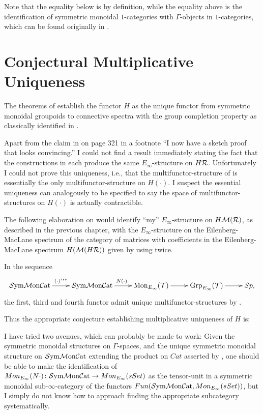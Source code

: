 Note that the equality below is by definition, while the equality above is the
identification of symmetric monoidal $1$-categories with $\Gamma$-objects in $1$-categories,
which can be found originally in \cite{Th1,Th2}.

\section{Conjectural Multiplicative Uniqueness}
The theorems of \cite{GGN} establish the functor $H$ as the unique
functor from symmetric monoidal groupoids to connective spectra with the
group completion property as classically identified in \cite{MT1978}. 

Apart from the claim in \cite{May2009} on page 321 in a footnote ``I now have 
a sketch proof that looks convincing.'' I could not find a result immediately 
stating the fact that the constructions in \cite{EM,May2009,GGN} each produce the 
same $E_\infty$-structure on $H\mathcal{R}$. Unfortunately I could not prove 
this uniqueness, i.e., that the multifunctor-structure 
of \cite{EM} is essentially the only multifunctor-structure on $H(\cdot)$. I suspect
the essential uniqueness can analogously to \cite{BGT,BGT2013,GGN} be specified to
say the space of multifunctor-structures on $H(\cdot)$ is actually contractible.

The following elaboration on \cite[p. 19]{GGN} would identify ``my'' 
$E_\infty$-structure on $H\mathcal{M}(\mathcal{R})$, as described in the previous chapter, 
with the $E_\infty$-structure on the Eilenberg-MacLane spectrum 
of the category of matrices with coefficients in the Eilenberg-MacLane
spectrum $H(\mathcal{M}(H\mathcal{R}))$ given by using \cite{EM} twice.

In the sequence
\[\xymatrix{\SymMonCat \ar[r]^{(\cdot)^{iso}} &\SymMonCat 
\ar[r]^{N(\cdot)} & \mathrm{Mon}_{E_\infty}(\mathcal{T})
\ar[r] & \mathrm{Grp}_{E_\infty}(\mathcal{T}) \ar[r] & Sp,}\]
the first, third and fourth functor admit unique multifunctor-structures by \cite{GGN}. 

Thus the appropriate conjecture establishing multiplicative uniqueness of $H$ is:
{}

I have tried two avenues, which can probably be made to work:
Given the symmetric monoidal structures on $\Gamma$-spaces, and the
unique symmetric monoidal structure on $\mathcal{S}\mathrm{ym}\mathcal{M}\mathrm{on}\mathcal{C}\mathrm{at}$ extending the product on $Cat$
asserted by \cite{GGN}, one should be able to make the identification 
of $Mon_{E_\infty}(N\cdot)\colon \mathcal{S}\mathrm{ym}\mathcal{M}\mathrm{on}\mathcal{C}\mathrm{at}\rightarrow Mon_{E_\infty}(sSet)$ 
as the tensor-unit in a symmetric monoidal sub-$\infty$-category of the functors 
$Fun(\mathcal{S}\mathrm{ym}\mathcal{M}\mathrm{on}\mathcal{C}\mathrm{at},Mon_{E_\infty}(sSet))$, but I simply do not know how to approach
finding the appropriate subcategory systematically.

